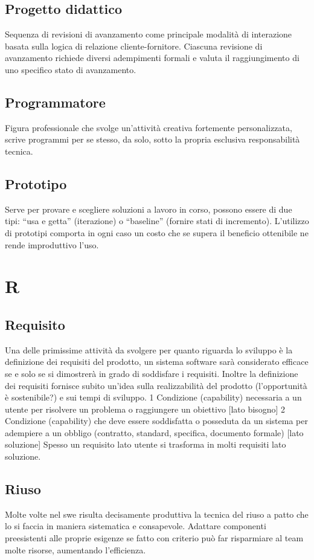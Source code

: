 \documentclass[a4paper]{report}
\newcommand{\mychapter}[2]{
	\setcounter{chapter}{#1}
	\setcounter{section}{0}
	\setcounter{subsection}{1}
	\chapter*{#2}
	\addcontentsline{toc}{chapter}{#2}
}
\begin{document}
\section{Progetto didattico} Sequenza di revisioni di avanzamento come principale modalità di interazione basata sulla logica di relazione cliente-fornitore. Ciascuna revisione di avanzamento richiede diversi adempimenti formali e valuta il raggiungimento di uno specifico stato di avanzamento.
\section{Programmatore} Figura professionale che svolge un’attività creativa fortemente personalizzata, scrive programmi per se stesso, da solo, sotto la propria esclusiva responsabilità tecnica.
\section{Prototipo} Serve per provare e scegliere soluzioni a lavoro in corso, possono essere di due tipi: “usa e getta” (iterazione) o “baseline” (fornire stati di incremento). L’utilizzo di prototipi comporta in ogni caso un costo che se supera il beneficio ottenibile ne rende improduttivo l’uso.

\mychapter{12}{R}

\section{Requisito}  Una delle primissime attività da svolgere per quanto riguarda lo sviluppo è la definizione dei requisiti del prodotto, un sistema software sarà considerato efficace se e solo se si dimostrerà in grado di soddisfare i requisiti. Inoltre la definizione dei requisiti fornisce subito un’idea sulla realizzabilità del prodotto (l’opportunità è sostenibile?) e sui tempi di sviluppo.
  1 Condizione (capability) necessaria a un utente per risolvere un problema o raggiungere un obiettivo [lato bisogno]
  2 Condizione (capability) che deve essere soddisfatta o posseduta da un sistema per adempiere a un obbligo (contratto, standard, specifica, documento formale) [lato soluzione]
Spesso un requisito lato utente si trasforma in molti requisiti lato soluzione.
\section{Riuso} Molte volte nel swe risulta decisamente produttiva la tecnica del riuso a patto che lo si faccia in maniera sistematica e consapevole. Adattare componenti preesistenti alle proprie esigenze se fatto con criterio può far risparmiare al team molte risorse, aumentando l’efficienza.
\end{document}
